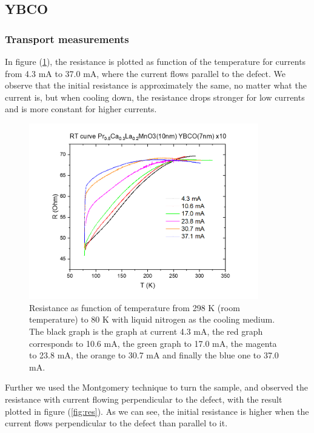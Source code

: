 \documentclass{comjnl}
\begin{document}
\subsection{YBCO}
\subsubsection{Transport measurements}
In figure (\ref{fig:res_norm}), the resistance is plotted as function of the temperature for currents from 4.3 mA to 37.0 mA, where the current flows parallel to the defect. We observe that the initial resistance is approximately the same, no matter what the current is, but when cooling down, the resistance drops stronger for low currents and is more constant for higher currents. 
\begin{figure}[h]
\centering
\includegraphics[width=100mm]{Bilde1.png}
\caption{Resistance as function of temperature from 298 K (room temperature) to 80 K with liquid nitrogen as the cooling medium. The black graph is the graph at current 4.3 mA, the red graph corresponds to 10.6 mA, the green graph to 17.0 mA, the magenta to 23.8 mA, the orange to 30.7 mA and finally the blue one to 37.0 mA. \label{fig:res_norm}}
\end{figure}
Further we used the Montgomery technique to turn the sample, and observed the resistance with current flowing perpendicular to the defect, with the result plotted in figure (\ref{fig:res}). As we can see, the initial resistance is higher when the current flows perpendicular to the defect than parallel to it. 
\end{document}
